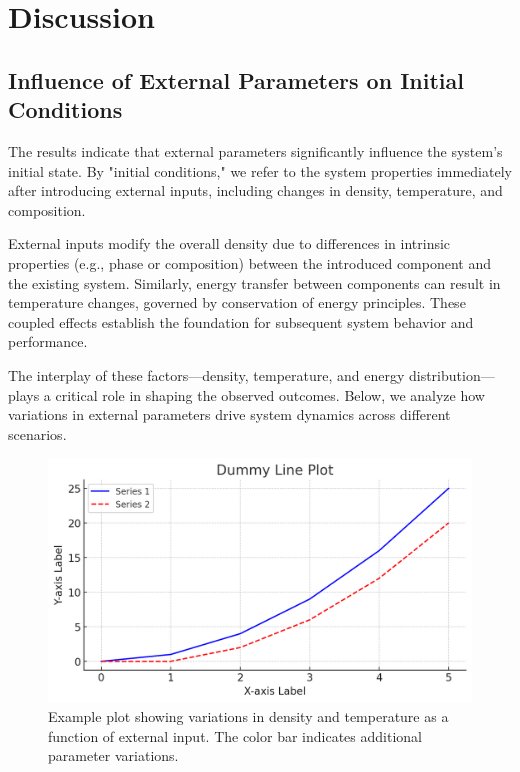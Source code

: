 \chapter{Discussion}

\fancyfoot[C]{\thepage}

\section{Influence of External Parameters on Initial Conditions}
The results indicate that external parameters significantly influence the system's initial state. By "initial conditions," we refer to the system properties immediately after introducing external inputs, including changes in density, temperature, and composition.

External inputs modify the overall density due to differences in intrinsic properties (e.g., phase or composition) between the introduced component and the existing system. Similarly, energy transfer between components can result in temperature changes, governed by conservation of energy principles. These coupled effects establish the foundation for subsequent system behavior and performance.

The interplay of these factors—density, temperature, and energy distribution—plays a critical role in shaping the observed outcomes. Below, we analyze how variations in external parameters drive system dynamics across different scenarios.

\begin{figure}[h!]
    \centering
    \includegraphics[width=130mm,scale=0.6]{body/images/placeholder_image1.png}
    \caption[System Properties at Initial State]{Example plot showing variations in density and temperature as a function of external input. The color bar indicates additional parameter variations.}
    \label{fig:initial_conditions}
\end{figure}

